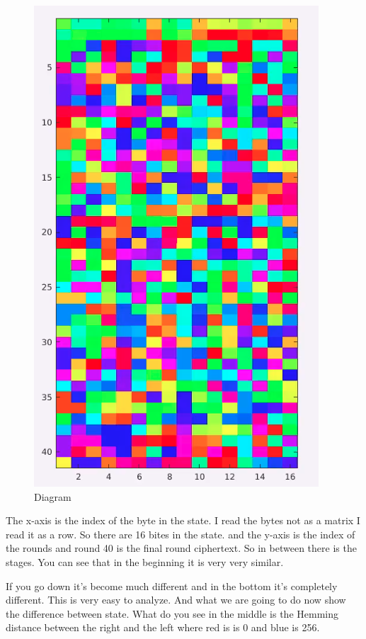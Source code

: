 \begin{figure}[!ht]
\centering
\includegraphics[scale=0.35]{images/Lecture_5/aes_mat_out.png}
\caption{Diagram}\label{fig:Diagram}
\end{figure}

The x-axis is the index of the byte in the state. I read the bytes not as a matrix I read it as a row. So there are 16 bites in the state. and the y-axis is the index of the rounds and round 40 is the final round ciphertext. So in between there is the stages.
You can see that in the beginning it is very very similar.

If you go down it's become much different and in the bottom it's completely different. This is very easy to analyze. And what we are going to do now show the difference between state. What do you see in the middle is the Hemming distance between the right and the left where red is is 0 and blue is 256.

